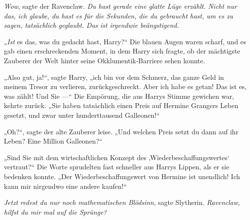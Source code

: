\emph{Wow}, sagte der Ravenclaw. \emph{Du hast gerade eine glatte Lüge erzählt. Nicht nur das, ich glaube, du hast es für die Sekunden, die du gebraucht hast, um es zu sagen, tatsächlich geglaubt. Das ist irgendwie beängstigend.}

„\emph{Ist} es das, was du gedacht hast, Harry?“
Die blauen Augen waren scharf, und es gab einen erschreckenden Moment, in dem Harry sich fragte, ob der mächtigste Zauberer der Welt hinter seine Okklumentik-Barriere sehen konnte.

„Also gut, ja!“, sagte Harry, „ich bin vor dem Schmerz, das ganze Geld in meinem Tresor zu verlieren, zurückgeschreckt. Aber ich habe es getan! Das ist es, was zählt! Und Sie —“
Die Empörung, die aus Harrys Stimme gewichen war, kehrte zurück.
„Sie haben tatsächlich einen Preis auf Hermine Grangers Leben gesetzt, und zwar unter hunderttausend Galleonen!“

„Oh?“, sagte der alte Zauberer leise.
„Und welchen Preis setzt du dann auf ihr Leben? Eine Million Galleonen?“

„Sind Sie mit dem wirtschaftlichen Konzept des ‚Wiederbeschaffungswertes‘ vertraut?“ Die Worte sprudelten fast schneller aus Harrys Lippen, als er sie bedenken konnte.
„Der Wiederbeschaffungswert von Hermine ist unendlich! Ich kann mir nirgendwo eine andere kaufen!“

\emph{Jetzt redest du nur noch mathematischen Blödsinn}, sagte Slytherin. \emph{Ravenclaw, hilfst du mir mal auf die Sprünge?}

